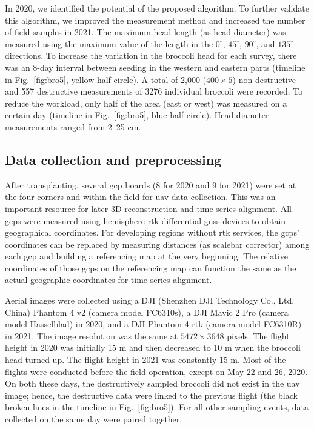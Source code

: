 In 2020, we identified the potential of the proposed algorithm. To further validate this algorithm, we improved the measurement method and increased the number of field samples in 2021. The maximum head length (as head diameter) was measured using the maximum value of the length in the $0^\circ$, $45^\circ$, $90^\circ$, and $135^\circ$ directions. To increase the variation in the broccoli head for each survey, there was an 8-day interval between seeding in the western and eastern parts (timeline in Fig.~\ref{fig:bro5}, yellow half circle). A total of 2,000 ($400 \times 5$) non-destructive and 557 destructive measurements of 3276 individual broccoli were recorded. To reduce the workload, only half of the area (east or west) was measured on a certain day (timeline in Fig.~\ref{fig:bro5}, blue half circle). Head diameter measurements ranged from 2‒25 cm.

\subsection{Data collection and preprocessing}

After transplanting, several \gls{gcp} boards (8 for 2020 and 9 for 2021) were set at the four corners and within the field for \gls{uav} data collection. This was an important resource for later 3D reconstruction and time-series alignment. All \gls{gcp}s were measured using hemisphere \gls{rtk} differential \gls{gnss} devices to obtain geographical coordinates. For developing regions without \gls{rtk} services, the \gls{gcp}s' coordinates can be replaced by measuring distances (as scalebar corrector) among each \gls{gcp} and building a referencing map at the very beginning. The relative coordinates of those \gls{gcp}s on the referencing map can function the same as the actual geographic coordinates for time-series alignment.

Aerial images were collected using a DJI (Shenzhen DJI Technology Co., Ltd. China) Phantom 4 v2 (camera model FC6310s), a DJI Mavic 2 Pro (camera model Hasselblad) in 2020, and a DJI Phantom 4 \gls{rtk} (camera model FC6310R) in 2021. The image resolution was the same at $5472 \times 3648$ pixels. The flight height in 2020 was initially 15 m and then decreased to 10 m when the broccoli head turned up. The flight height in 2021 was constantly 15 m. Most of the flights were conducted before the field operation, except on May 22 and 26, 2020. On both these days, the destructively sampled broccoli did not exist in the \gls{uav} image; hence, the destructive data were linked to the previous flight (the black broken lines in the timeline in Fig.~\ref{fig:bro5}). For all other sampling events, data collected on the same day were paired together.

